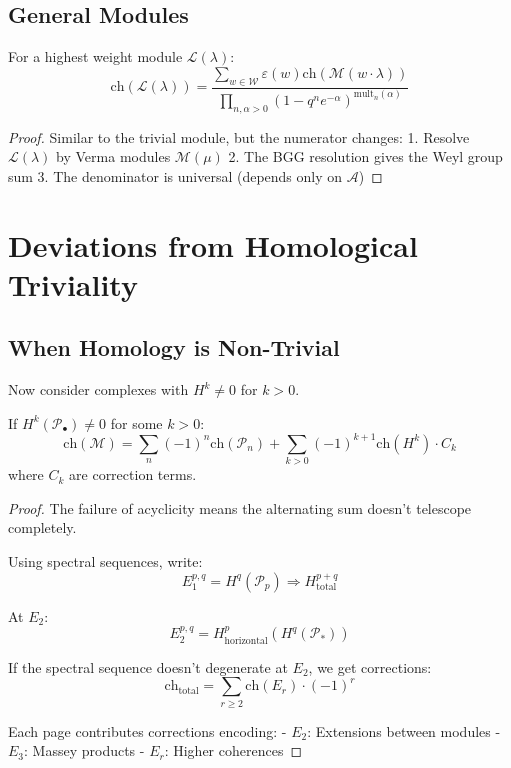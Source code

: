 \subsection{General Modules}

\begin{theorem}
For a highest weight module $\mathcal{L}(\lambda)$:
\[
\text{ch}(\mathcal{L}(\lambda)) = \frac{\sum_{w \in \mathcal{W}} \varepsilon(w) \text{ch}(\mathcal{M}(w \cdot \lambda))}{\prod_{n,\alpha > 0} (1 - q^n e^{-\alpha})^{\text{mult}_n(\alpha)}}
\]
\end{theorem}

\begin{proof}
Similar to the trivial module, but the numerator changes:
1. Resolve $\mathcal{L}(\lambda)$ by Verma modules $\mathcal{M}(\mu)$
2. The BGG resolution gives the Weyl group sum
3. The denominator is universal (depends only on $\mathcal{A}$)
\end{proof}

\section{Deviations from Homological Triviality}

\subsection{When Homology is Non-Trivial}

Now consider complexes with $H^k \neq 0$ for $k > 0$.

\begin{theorem}
If $H^k(\mathcal{P}_\bullet) \neq 0$ for some $k > 0$:
\[
\text{ch}(\mathcal{M}) = \sum_{n} (-1)^n \text{ch}(\mathcal{P}_n) + \sum_{k > 0} (-1)^{k+1} \text{ch}(H^k) \cdot C_k
\]
where $C_k$ are correction terms.
\end{theorem}

\begin{proof}
The failure of acyclicity means the alternating sum doesn't telescope completely.

Using spectral sequences, write:
\[
E_1^{p,q} = H^q(\mathcal{P}_p) \Rightarrow H^{p+q}_{\text{total}}
\]

At $E_2$:
\[
E_2^{p,q} = H^p_{\text{horizontal}}(H^q(\mathcal{P}_*))
\]

If the spectral sequence doesn't degenerate at $E_2$, we get corrections:
\[
\text{ch}_{\text{total}} = \sum_{r \geq 2} \text{ch}(E_r) \cdot (-1)^r
\]

Each page contributes corrections encoding:
- $E_2$: Extensions between modules
- $E_3$: Massey products
- $E_r$: Higher coherences
\end{proof}

